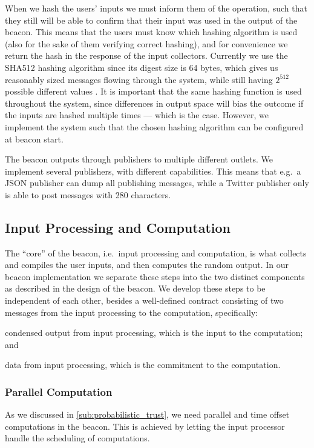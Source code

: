 When we hash the users' inputs we must inform them of the operation, such that they still will be able to confirm that their input was used in the output of the beacon.
This means that the users must know which hashing algorithm is used (also for the sake of them verifying correct hashing), and for convenience we return the hash in the response of the input collectors.
Currently we use the SHA512 hashing algorithm since its digest size is 64 bytes, which gives us reasonably sized messages flowing through the system, while still having $2^{512}$ possible different values .
It is important that the same hashing function is used throughout the system, since differences in output space will bias the outcome if the inputs are hashed multiple times --- which is the case.
However, we implement the system such that the chosen hashing algorithm can be configured at beacon start.

The beacon outputs through publishers to multiple different outlets.
We implement several publishers, with different capabilities.
This means that e.g.\ a JSON publisher can dump all publishing messages, while a Twitter publisher only is able to post messages with 280 characters.

\subsection{Input Processing and Computation}%
\label{sub:input_processing_and_computation}
The \enquote{core} of the beacon, i.e.\ input processing and computation, is what collects and compiles the user inputs, and then computes the random output.
In our beacon implementation we separate these steps into the two distinct components as described in the design of the beacon.
We develop these steps to be independent of each other, besides a well-defined contract consisting of two messages from the input processing to the computation, specifically:
\begin{eletterate*}
\item condensed output from input processing, which is the input to the computation; and
\item data from input processing, which is the commitment to the computation.
\end{eletterate*}

\subsubsection{Parallel Computation}%
\label{ssub:parallel_computation}
As we discussed in \cref{sub:probabilistic_trust}, we need parallel and time offset computations in the beacon.
This is achieved by letting the input processor handle the scheduling of computations.

